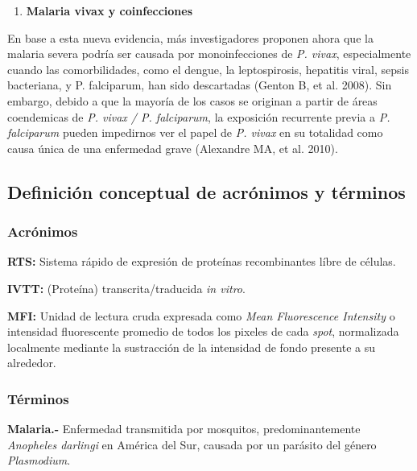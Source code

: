 \documentclass[]{article}
\providecommand{\tightlist}{%
  \setlength{\itemsep}{0pt}\setlength{\parskip}{0pt}}
\begin{document}
\begin{enumerate}
  \begin{enumerate}
  \def\labelenumii{\roman{enumii}.}
  \setcounter{enumii}{1}
  \tightlist
  \item
    \textbf{Malaria vivax y coinfecciones}
  \end{enumerate}

  En base a esta nueva evidencia, más investigadores proponen ahora que
  la malaria severa podría ser causada por monoinfecciones de \emph{P.
  vivax}, especialmente cuando las comorbilidades, como el dengue, la
  leptospirosis, hepatitis viral, sepsis bacteriana, y P. falciparum,
  han sido descartadas (Genton B, et al. 2008). Sin embargo, debido a
  que la mayoría de los casos se originan a partir de áreas coendemicas
  de \emph{P. vivax / P. falciparum}, la exposición recurrente previa a
  \emph{P. falciparum} pueden impedirnos ver el papel de \emph{P. vivax}
  en su totalidad como causa única de una enfermedad grave (Alexandre
  MA, et al. 2010).
\end{enumerate}

\subsection{Definición conceptual de acrónimos y
términos}\label{definicion-conceptual-de-acronimos-y-terminos}

\subsubsection{Acrónimos}\label{acronimos}

\textbf{RTS:} Sistema rápido de expresión de proteínas recombinantes
líbre de células.

\textbf{IVTT:} (Proteína) transcrita/traducida \emph{in vitro}.

\textbf{MFI:} Unidad de lectura cruda expresada como \emph{Mean
Fluorescence Intensity} o intensidad fluorescente promedio de todos los
pixeles de cada \emph{spot}, normalizada localmente mediante la
sustracción de la intensidad de fondo presente a su alrededor.

\subsubsection{Términos}\label{terminos}

\textbf{Malaria.-} Enfermedad transmitida por mosquitos,
predominantemente \emph{Anopheles darlingi} en América del Sur, causada
por un parásito del género \emph{Plasmodium}.
\end{document}
